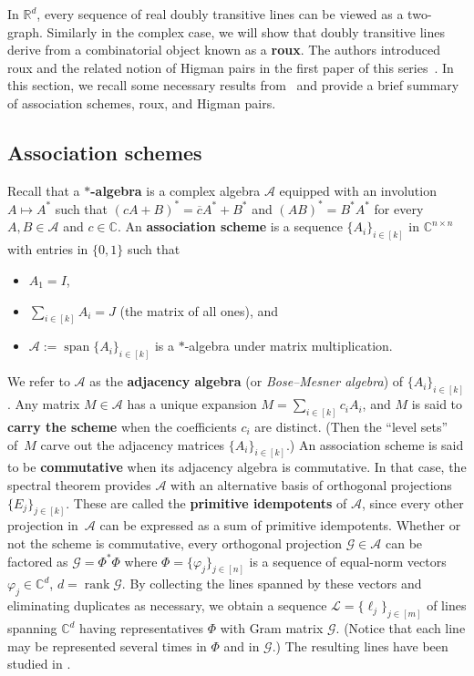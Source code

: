 In $\mathbb{R}^d$, every sequence of real doubly transitive lines can be viewed as a two-graph.
Similarly in the complex case, we will show that doubly transitive lines derive from a combinatorial object known as a \textbf{roux}.
The authors introduced roux and the related notion of Higman pairs in the first paper of this series~\cite{IversonM:18}.
In this section, we recall some necessary results from~\cite{IversonM:18} and provide a brief summary of association schemes, roux, and Higman pairs.

\subsection{Association schemes}

Recall that a \textbf{$*$-algebra} is a complex algebra $\mathscr{A}$ equipped with an involution $A \mapsto A^*$ such that $(cA+B)^* =\overline{c}A^* + B^*$ and $(AB)^* = B^* A^*$ for every $A,B \in \mathscr{A}$ and $c \in \mathbb{C}$.
An \textbf{association scheme} is a sequence $\{A_i\}_{i\in[k]}$ in $\mathbb{C}^{n\times n}$ with entries in $\{0,1\}$ such that
\begin{itemize}
\item[(A1)]
$A_1=I$,
\item[(A2)]
$\sum_{i\in[k]}A_i=J$ (the matrix of all ones), and
\item[(A3)]
$\mathscr{A}:=\operatorname{span}\{A_i\}_{i\in[k]}$ is a $*$-algebra under matrix multiplication.
\end{itemize}
We refer to $\mathscr{A}$ as the \textbf{adjacency algebra} (or \textit{Bose--Mesner algebra}) of $\{ A_i \}_{i \in [k]}$.
Any matrix $M \in \mathscr{A}$ has a unique expansion $M = \sum_{i \in [k]} c_i A_i$, and $M$ is said to \textbf{carry the scheme} when the coefficients $c_i$ are distinct.
(Then the ``level sets'' of~$M$ carve out the adjacency matrices $\{A_i\}_{i\in [k]}$.)
An association scheme is said to be \textbf{commutative} when its adjacency algebra is commutative.
In that case, the spectral theorem provides $\mathscr{A}$ with an alternative basis of orthogonal projections $\{ E_j \}_{j\in [k]}$.
These are called the \textbf{primitive idempotents} of $\mathscr{A}$, since every other projection in~$\mathscr{A}$ can be expressed as a sum of primitive idempotents.
Whether or not the scheme is commutative, every orthogonal projection $\mathcal{G} \in \mathscr{A}$ can be factored as $\mathcal{G} = \Phi^* \Phi$ where $\Phi = \{ \varphi_j \}_{j\in [n]}$ is a sequence of equal-norm vectors $ \varphi_j \in \mathbb{C}^d$, $d = \operatorname{rank} \mathcal{G}$.
By collecting the lines spanned by these vectors and eliminating duplicates as necessary, we obtain a sequence $\mathscr{L} = \{ \ell_j \}_{j\in [m]}$ of lines spanning $\mathbb{C}^d$ having representatives $\Phi$ with Gram matrix $\mathcal{G}$.
(Notice that each line may be represented several times in $\Phi$ and in $\mathcal{G}$.)
The resulting lines have been studied in \cite{DelsarteGS:77,IversonJM:19,IversonJM:SPIE:17,IversonJM:17}.

